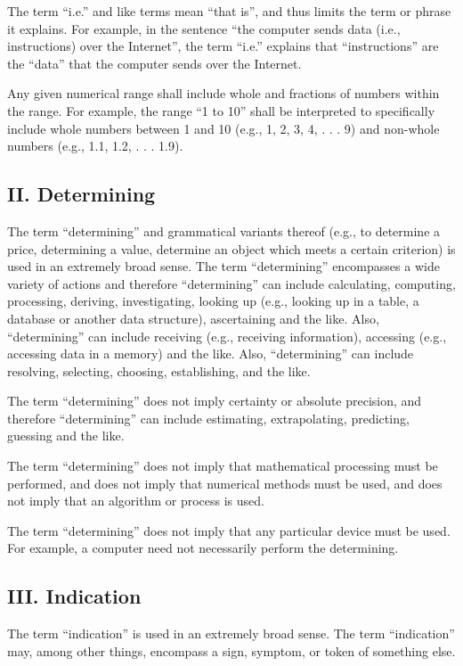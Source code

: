 \documentclass[11pt,a4paper]{article}
\begin{document}
The term “i.e.” and like terms mean “that is”, and thus limits the term or phrase it explains. For example, in the sentence “the computer sends data (i.e., instructions) over the Internet”, the term “i.e.” explains that “instructions” are the “data” that the computer sends over the Internet.

Any given numerical range shall include whole and fractions of numbers within the range. For example, the range “1 to 10” shall be interpreted to specifically include whole numbers between 1 and 10 (e.g., 1, 2, 3, 4, . . . 9) and non-whole numbers (e.g., 1.1, 1.2, . . . 1.9).

\subsection{II. Determining}

The term “determining” and grammatical variants thereof (e.g., to determine a price, determining a value, determine an object which meets a certain criterion) is used in an extremely broad sense. The term “determining” encompasses a wide variety of actions and therefore “determining” can include calculating, computing, processing, deriving, investigating, looking up (e.g., looking up in a table, a database or another data structure), ascertaining and the like. Also, “determining” can include receiving (e.g., receiving information), accessing (e.g., accessing data in a memory) and the like. Also, “determining” can include resolving, selecting, choosing, establishing, and the like.

The term “determining” does not imply certainty or absolute precision, and therefore “determining” can include estimating, extrapolating, predicting, guessing and the like.

The term “determining” does not imply that mathematical processing must be performed, and does not imply that numerical methods must be used, and does not imply that an algorithm or process is used.

The term “determining” does not imply that any particular device must be used. For example, a computer need not necessarily perform the determining.

\subsection{III. Indication}

The term “indication” is used in an extremely broad sense. The term “indication” may, among other things, encompass a sign, symptom, or token of something else.
\end{document}
